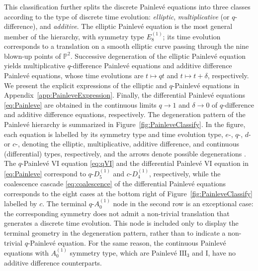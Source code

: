 \documentclass[11pt, a4paper]{article}
\theoremstyle{definition}
\begin{document}
This classification further splits the discrete Painlev\'e equations into three classes according to the type of discrete time evolution: \emph{elliptic}, \emph{multiplicative} (or $ q $-difference), and \emph{additive}. The elliptic Painlev\'e equation is the most general member of the hierarchy, with symmetry type $ E_8^{(1)} $; its time evolution corresponds to a translation on a smooth elliptic curve passing through the nine blown-up points of $ \mathbb{P}^2 $. Successive degeneration of the elliptic Painlev\'e equation yields multiplicative $ q $-difference Painlev\'e equations and additive difference Painlev\'e equations, whose time evolutions are $ t\mapsto qt $ and $ t \mapsto t+\delta $, respectively. We present the explicit expressions of the elliptic and $ q $-Painlev\'e equations in Appendix~\ref{app:PainleveExpression}. Finally, the differential Painlev\'e equations \eqref{eq:Painleve} are obtained in the continuous limits $ q\to 1 $ and $ \delta\to 0 $ of $ q $-difference and additive difference equations, respectively. The degeneration pattern of the Painlev\'e hierarchy is summarized in Figure~\ref{fig:PainleveClassify}. In the figure, each equation is labelled by its symmetry type and time evolution type, $ e $-, $ q $-, $ d $- or $ c $-, denoting the elliptic, multiplicative, additive difference, and continuous (differential) types, respectively, and the arrows denote possible degenerations \cite{Rains:2013, Dzhamay:2018}. The $ q $-Painlev\'e VI equation \eqref{eq:qVI} and the differential Painlev\'e VI equation in \eqref{eq:Painleve} correspond to $ q\text{-}D_5^{(1)} $ and $ c\text{-}D_4^{(1)} $, respectively, while the coalescence cascade \eqref{eq:coalescence} of the differential Painlev\'e equations corresponds to the eight cases at the bottom right of Figure~\ref{fig:PainleveClassify} labelled by $ c $. The terminal $ q\text{-}A_0^{(1)} $ node in the second row is an exceptional case: the corresponding symmetry does not admit a non-trivial translation that generates a discrete time evolution. This node is included only to display the terminal geometry in the degeneration pattern, rather than to indicate a non-trivial $ q $-Painlev\'e equation. For the same reason, the continuous Painlev\'e equations with $ A_0^{(1)} $ symmetry type, which are Painlev\'e $ \text{III}_3 $ and I, have no additive difference counterparts.
\end{document}
